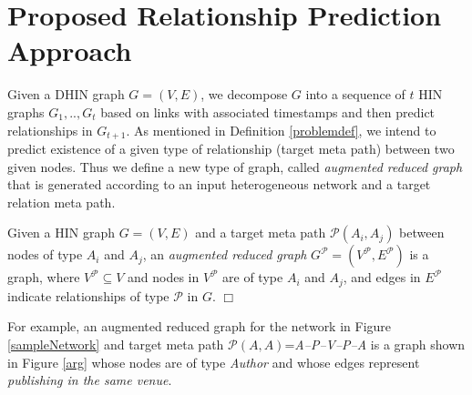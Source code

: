 \section{Proposed Relationship Prediction Approach}

Given a DHIN graph $G=(V,E)$, we decompose $G$ into a sequence of $t$ HIN graphs ${G_1, .., G_t}$ based on links with associated timestamps and then predict relationships in $G_{t+1}$. As mentioned in Definition \ref{problemdef}, we intend to predict existence of a given type of relationship (target meta path) between two given nodes. Thus we define a new type of graph, called \textit{augmented reduced graph} that is generated according to an input heterogeneous network and a target relation meta path. 


\begin{definition}\label{def:ARG}
Given a HIN graph $G=(V,E)$ and a target meta path $\mathcal{P}(A_i,A_j)$ between nodes of type $A_i$ and $A_j$, an \textit{augmented reduced graph} $G^\mathcal{P}=(V^\mathcal{P},E^\mathcal{P})$ is a graph, where $V^\mathcal{P} \subseteq V$ and nodes in $V^\mathcal{P}$ are of type $A_i$ and $A_j$, and edges in $E^\mathcal{P}$ indicate relationships of type $\mathcal{P}$ in $G$. $\Box$
\end{definition}


For example, an augmented reduced graph for the network in Figure \ref{sampleNetwork} and target meta path $\mathcal{P}(A,A)$=\textit{A--P--V--P--A} is a graph shown in Figure \ref{arg} whose nodes are of type \textit{Author} and whose edges represent \textit{publishing in the same venue}. %


